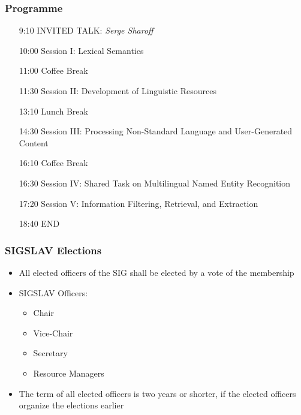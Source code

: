 \documentclass{beamer}
\begin{document}






\begin{frame}
 \frametitle{Programme}

\begin{itemize}

\item[9:10] INVITED TALK: \textit{Serge Sharoff}

\item[10:00] Session I: Lexical Semantics

\item[11:00] {\color{darkgreen}Coffee Break}

\item[11:30] Session II: Development of Linguistic Resources

\item[13:10] {\color{darkgreen}Lunch Break}

\item[14:30] Session III: Processing Non-Standard Language and User-Generated Content

\item[16:10] {\color{darkgreen}Coffee Break}

\item[16:30] Session IV: Shared Task on Multilingual Named Entity Recognition

\item[17:20] Session V: Information Filtering, Retrieval, and Extraction

\item[18:40] END 

\end{itemize}

\end{frame}

\begin{frame}[fragile]
\frametitle{SIGSLAV Elections}

\begin{itemize}
\item All elected officers of the SIG shall be elected by a vote of the membership
\item SIGSLAV Officers:
\begin{itemize}
\item Chair
\item Vice-Chair
\item Secretary
\item Resource Managers
\end{itemize}
\item The term of all elected officers is two years or shorter, if the elected officers organize the elections earlier
\end{itemize}
\end{frame}
\end{document}
